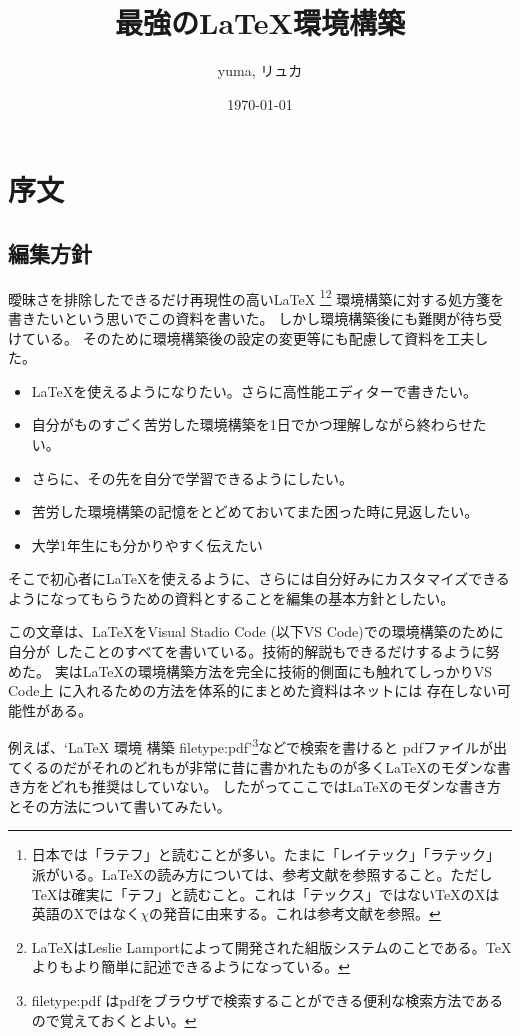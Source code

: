 \documentclass[titlepage]{ltjsarticle}
\begin{document}
\title{最強の\LaTeX 環境構築}
\author{yuma, リュカ}
\date{\today}
\maketitle
\section{序文}
\subsection{編集方針}

曖昧さを排除したできるだけ再現性の高い\LaTeX \index{\LaTeX}
\footnote{日本では「ラテフ」と読むことが多い。たまに「レイテック」「ラテック」派がいる。\LaTeX の読み方については、参考文献\cite{文書システムLaTeX}\cite{LaTeXの読み方}を参照すること。ただし\TeX は確実に「テフ」と読むこと。これは「テックス」ではない\TeX のXは英語のXではなく\(\chi\)の発音に由来する。これは参考文献\cite{TeXの発音について}を参照。}\footnote{\LaTeX はLeslie Lamportによって開発された組版システムのことである。\TeX よりもより簡単に記述できるようになっている。}
環境構築に対する処方箋を書きたいという思いでこの資料を書いた。
しかし環境構築後にも難関が待ち受けている。
そのために環境構築後の設定の変更等にも配慮して資料を工夫した。
\begin{itemize}
  \item \LaTeX を使えるようになりたい。さらに高性能エディターで書きたい。
  \item 自分がものすごく苦労した環境構築を1日でかつ理解しながら終わらせたい。
  \item さらに、その先を自分で学習できるようにしたい。
  \item 苦労した環境構築の記憶をとどめておいてまた困った時に見返したい。
  \item 大学1年生にも分かりやすく伝えたい
\end{itemize}
そこで初心者に\LaTeX を使えるように、さらには自分好みにカスタマイズできるようになってもらうための資料とすることを編集の基本方針としたい。

この文章は、\LaTeX をVisual Stadio Code (以下VS Code)での環境構築のために自分が
したことのすべてを書いている。技術的解説もできるだけするように努めた。
実は\LaTeX の環境構築方法を完全に技術的側面にも触れてしっかりVS Code上
に入れるための方法を体系的にまとめた資料はネットには
存在しない可能性がある。

例えば、`LaTeX 環境 構築 filetype:pdf'\footnote{filetype:pdf はpdfをブラウザで検索することができる便利な検索方法であるので覚えておくとよい。}などで検索を書けると
pdfファイルが出てくるのだがそれのどれもが非常に昔に書かれたものが多く\LaTeX のモダンな書き方をどれも推奨はしていない。
したがってここでは\LaTeX のモダンな書き方とその方法について書いてみたい。
\end{document}
